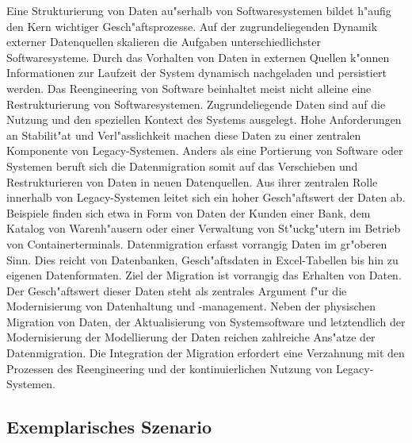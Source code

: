 Eine Strukturierung von Daten au"serhalb von Softwaresystemen bildet h"aufig den Kern wichtiger Gesch"aftsprozesse. Auf der zugrundeliegenden Dynamik externer Datenquellen skalieren die Aufgaben unterschiedlichster Softwaresysteme. Durch das Vorhalten von Daten in externen Quellen k"onnen Informationen zur Laufzeit der System dynamisch nachgeladen und persistiert werden.
\lb
Das Reengineering von Software beinhaltet meist nicht alleine eine Restrukturierung von Softwaresystemen. Zugrundeliegende Daten sind auf die Nutzung und den speziellen Kontext des Systems ausgelegt. Hohe Anforderungen an Stabilit"at und Verl"asslichkeit machen diese Daten zu einer zentralen Komponente von Legacy-Systemen.
\lb
Anders als eine Portierung von Software oder Systemen beruft sich die Datenmigration somit auf das Verschieben und Restrukturieren von Daten in neuen Datenquellen.
\lb
Aus ihrer zentralen Rolle innerhalb von Legacy-Systemen leitet sich ein hoher Gesch"aftswert der Daten ab. Beispiele finden sich etwa in Form von Daten der Kunden einer Bank, dem Katalog von Warenh"ausern oder einer Verwaltung von St"uckg"utern im Betrieb von Containerterminals. 
\lb
Datenmigration erfasst vorrangig Daten im gr"oberen Sinn. Dies reicht von Datenbanken, Gesch"aftsdaten in Excel-Tabellen bis hin zu eigenen Datenformaten. Ziel der Migration ist vorrangig das Erhalten von Daten. Der Gesch"aftswert dieser Daten steht als zentrales Argument f"ur die Modernisierung von Datenhaltung und -management. Neben der physischen Migration von Daten, der Aktualisierung von Systemsoftware und letztendlich der Modernisierung der Modellierung der Daten reichen zahlreiche Ans"atze der Datenmigration. Die Integration der Migration erfordert eine Verzahnung mit den Prozessen des Reengineering und der kontinuierlichen Nutzung von Legacy-Systemen.

\subsection{Exemplarisches Szenario}

